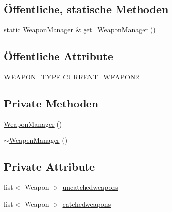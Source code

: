\subsection*{Öffentliche, statische Methoden}
\begin{DoxyCompactItemize}
\item 
static \hyperlink{class_weapon_manager}{Weapon\-Manager} \& \hyperlink{class_weapon_manager_a43dc0489aed7aad37a65a0e6d687f06c}{get\-\_\-\-Weapon\-Manager} ()
\end{DoxyCompactItemize}
\subsection*{Öffentliche Attribute}
\begin{DoxyCompactItemize}
\item 
\hyperlink{globals_8h_adee3cd4bc0db6b52507cfc49432856f2}{W\-E\-A\-P\-O\-N\-\_\-\-T\-Y\-P\-E} \hyperlink{class_weapon_manager_a25afeaede894545ee2f7d7f9f1ce760d}{C\-U\-R\-R\-E\-N\-T\-\_\-\-W\-E\-A\-P\-O\-N2}
\end{DoxyCompactItemize}
\subsection*{Private Methoden}
\begin{DoxyCompactItemize}
\item 
\hyperlink{class_weapon_manager_a4def02f745b1f22c4fed349379ea8c0b}{Weapon\-Manager} ()
\item 
\hyperlink{class_weapon_manager_a240f037e5294e11081ca3cce1ab4651e}{$\sim$\-Weapon\-Manager} ()
\end{DoxyCompactItemize}
\subsection*{Private Attribute}
\begin{DoxyCompactItemize}
\item 
list$<$ Weapon $>$ \hyperlink{class_weapon_manager_ac26b9bec2027a8b153e902ec4218cd5a}{uncatchedweapons}
\item 
list$<$ Weapon $>$ \hyperlink{class_weapon_manager_abf481b37e59662c0eb976cfda84dd2fe}{catchedweapons}
\end{DoxyCompactItemize}


